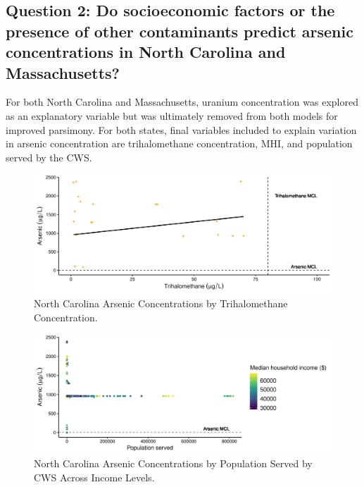 \documentclass[12pt,]{article}
\begin{document}
\hypertarget{question-2-do-socioeconomic-factors-or-the-presence-of-other-contaminants-predict-arsenic-concentrations-in-north-carolina-and-massachusetts}{%
\subsection{Question 2: Do socioeconomic factors or the presence of
other contaminants predict arsenic concentrations in North Carolina and
Massachusetts?}\label{question-2-do-socioeconomic-factors-or-the-presence-of-other-contaminants-predict-arsenic-concentrations-in-north-carolina-and-massachusetts}}

For both North Carolina and Massachusetts, uranium concentration was
explored as an explanatory variable but was ultimately removed from both
models for improved parsimony. For both states, final variables included
to explain variation in arsenic concentration are trihalomethane
concentration, MHI, and population served by the CWS.

\begin{figure}
\centering
\includegraphics{Project_Template_files/figure-latex/figs9-1.pdf}
\caption{North Carolina Arsenic Concentrations by Trihalomethane
Concentration.}
\end{figure}

\begin{figure}
\centering
\includegraphics{Project_Template_files/figure-latex/figs10-1.pdf}
\caption{North Carolina Arsenic Concentrations by Population Served by
CWS Across Income Levels.}
\end{figure}
\end{document}
